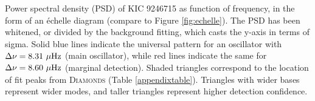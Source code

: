 \label{fig:appendixfig}
Power spectral density (PSD) of KIC 9246715 as function of frequency, in the form of an \'echelle diagram (compare to Figure \ref{fig:echelle}). The PSD has been whitened, or divided by the background fitting, which casts the y-axis in terms of sigma. Solid blue lines indicate the universal pattern for an oscillator with $\Delta \nu = 8.31 \ \mu \rm{Hz}$ (main oscillator), while red lines indicate the same for $\Delta \nu = 8.60 \ \mu \rm{Hz}$ (marginal detection). Shaded triangles correspond to the location of fit peaks from \textsc{D\large{iamonds}} (Table \ref{appendixtable}). Triangles with wider bases represent wider modes, and taller triangles represent higher detection confidence.